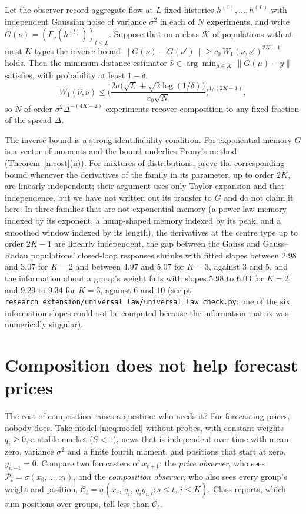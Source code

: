 \begin{proposition}\label{n:univup}
Let the observer record aggregate flow at $L$ fixed histories $h^{(1)},\ldots,h^{(L)}$ with independent Gaussian noise of variance $\sigma^2$ in each of $N$ experiments, and write $G(\nu)=(F_\nu(h^{(l)}))_{l\le L}$. Suppose that on a class $\mathcal K$ of populations with at most $K$ types the inverse bound $\|G(\nu)-G(\nu')\|\ge c_0\,W_1(\nu,\nu')^{2K-1}$ holds. Then the minimum-distance estimator $\hat\nu\in\arg\min_{\mu\in\mathcal K}\|G(\mu)-\bar y\|$ satisfies, with probability at least $1-\delta$,
\[
W_1(\hat\nu,\nu)\le\Big(\frac{2\sigma\big(\sqrt L+\sqrt{2\log(1/\delta)}\big)}{c_0\sqrt N}\Big)^{1/(2K-1)},
\]
so $N$ of order $\sigma^2\Delta^{-(4K-2)}$ experiments recover composition to any fixed fraction of the spread $\Delta$.
\end{proposition}

The inverse bound is a strong-identifiability condition. For exponential memory $G$ is a vector of moments and the bound underlies Prony's method (Theorem~\ref{n:cost}(ii)). For mixtures of distributions, \citet{heinrich2018} prove the corresponding bound whenever the derivatives of the family in its parameter, up to order $2K$, are linearly independent; their argument uses only Taylor expansion and that independence, but we have not written out its transfer to $G$ and do not claim it here. In three families that are not exponential memory (a power-law memory indexed by its exponent, a hump-shaped memory indexed by its peak, and a smoothed window indexed by its length), the derivatives at the centre type up to order $2K-1$ are linearly independent, the gap between the Gauss and Gauss--Radau populations' closed-loop responses shrinks with fitted slopes between $2.98$ and $3.07$ for $K=2$ and between $4.97$ and $5.07$ for $K=3$, against $3$ and $5$, and the information about a group's weight falls with slopes $5.98$ to $6.03$ for $K=2$ and $9.29$ to $9.34$ for $K=3$, against $6$ and $10$ (script \nolinkurl{research_extension/universal_law/universal_law_check.py}; one of the six information slopes could not be computed because the information matrix was numerically singular).

\section{Composition does not help forecast prices}\label{n:irr_sec}

The cost of composition raises a question: who needs it? For forecasting prices, nobody does. Take model \eqref{n:eq:model} without probes, with constant weights $q_i\ge0$, a stable market ($S<1$), news that is independent over time with mean zero, variance $\sigma^2$ and a finite fourth moment, and positions that start at zero, $y_{i,-1}=0$. Compare two forecasters of $x_{t+1}$: the \emph{price observer}, who sees $\mathcal P_t=\sigma(x_0,\ldots,x_t)$, and the \emph{composition observer}, who also sees every group's weight and position, $\mathcal C_t=\sigma(x_s,\,q_i,\,q_iy_{i,s}:s\le t,\,i\le K)$. Class reports, which sum positions over groups, tell less than $\mathcal C_t$.

